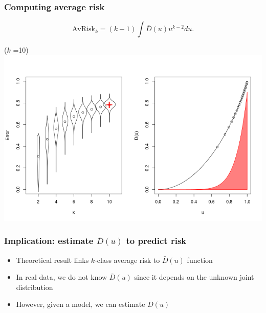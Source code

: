 \documentclass{beamer}
\begin{document}
\begin{frame}
\frametitle{Computing average risk}
\[
\text{AvRisk}_k = (k-1) \int \bar{D}(u) u^{k-2} du.
\]
\begin{center}
($k$ {\tiny =}\hspace{0.025in}10)
\includegraphics[scale = 0.4, clip=true, trim=0 0.1in 0 0.7in]{../extrapolation/rho_0_7_fmla10.png}
\end{center}
\end{frame}

\begin{frame}
\frametitle{Implication: estimate $\bar{D}(u)$ to predict risk}
\begin{itemize}
\item Theoretical result links $k$-class average risk to $\bar{D}(u)$ function
\item In real data, we do not know $\bar{D}(u)$ since it depends on the unknown joint distribution
\item However, given a model, we can estimate $\bar{D}(u)$
\end{itemize}
\end{frame}
\end{document}
